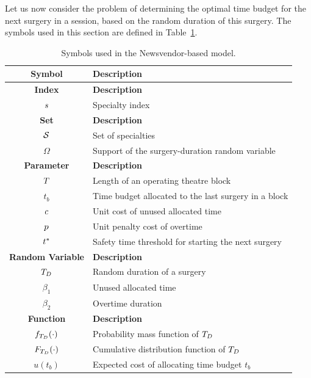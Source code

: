 Let us now consider the problem of determining the optimal time budget for the next surgery in a session, based on the random duration of this surgery. The symbols used in this section are defined in Table~\ref{tab:symb_newsvendor}.
\begin{table}[htb]
    \centering
    \caption{Symbols used in the Newsvendor-based model.\label{tab:symb_newsvendor}}
    \scriptsize
    \begin{tabular}{cl}
    \toprule
    \textbf{Symbol} & \textbf{Description} \\
    \midrule
    \textbf{Index} & \textbf{Description} \\
    \midrule
    $s$ & Specialty index \\
    \midrule

    \textbf{Set} & \textbf{Description} \\
    \midrule
    $\mathcal{S}$ & Set of specialties \\
    $\Omega$ & Support of the surgery-duration random variable \\
    \midrule

    \textbf{Parameter} & \textbf{Description} \\
    \midrule
    $T$ & Length of an operating theatre block \\
    $t_b$ & Time budget allocated to the last surgery in a block \\
    $c$ & Unit cost of unused allocated time \\
    $p$ & Unit penalty cost of overtime \\
    $t^{*}$ & Safety time threshold for starting the next surgery \\
    \midrule

    \textbf{Random Variable} & \textbf{Description} \\
    \midrule
    $T_D$ & Random duration of a surgery \\
    $\beta_1$ & Unused allocated time \\
    $\beta_2$ & Overtime duration \\
    \midrule

    \textbf{Function} & \textbf{Description} \\
    \midrule
    $f_{T_D}(\cdot)$ & Probability mass function of $T_D$ \\
    $F_{T_D}(\cdot)$ & Cumulative distribution function of $T_D$ \\
    $u(t_b)$ & Expected cost of allocating time budget $t_b$ \\
    \midrule
    \end{tabular}
\end{table}

